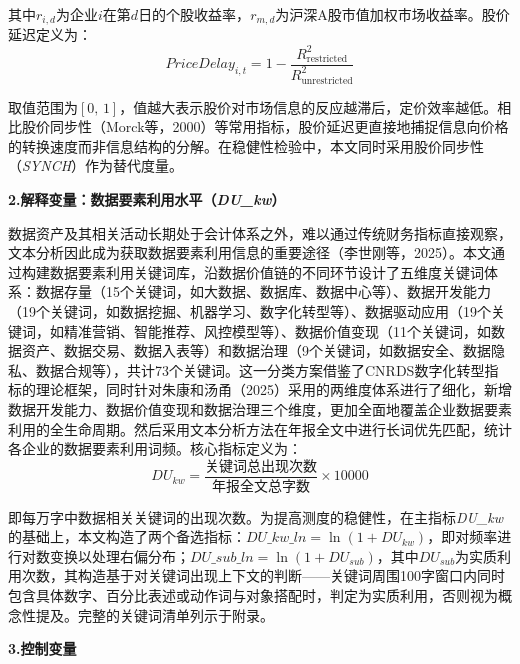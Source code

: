 \documentclass[11pt,a4paper]{article}
\begin{document}
其中$r_{i,d}$为企业$i$在第$d$日的个股收益率，$r_{m,d}$为沪深A股市值加权市场收益率。股价延迟定义为：
\vspace{-6pt}
\[ PriceDelay_{i,t} = 1 - \frac{R^2_{\text{restricted}}}{R^2_{\text{unrestricted}}} \]
\vspace{-6pt}

取值范围为$[0,\,1]$，值越大表示股价对市场信息的反应越滞后，定价效率越低。相比股价同步性（Morck等，2000）等常用指标，股价延迟更直接地捕捉信息向价格的转换速度而非信息结构的分解。在稳健性检验中，本文同时采用股价同步性（\textit{SYNCH}）作为替代度量。

\vspace{6pt}
\noindent\textbf{2.\hspace{0.5em}解释变量：数据要素利用水平（\textit{DU\_kw}）}

\vspace{2pt}

数据资产及其相关活动长期处于会计体系之外，难以通过传统财务指标直接观察，文本分析因此成为获取数据要素利用信息的重要途径（李世刚等，2025）。本文通过构建数据要素利用关键词库，沿数据价值链的不同环节设计了五维度关键词体系：数据存量（15个关键词，如大数据、数据库、数据中心等）、数据开发能力（19个关键词，如数据挖掘、机器学习、数字化转型等）、数据驱动应用（19个关键词，如精准营销、智能推荐、风控模型等）、数据价值变现（11个关键词，如数据资产、数据交易、数据入表等）和数据治理（9个关键词，如数据安全、数据隐私、数据合规等），共计73个关键词。这一分类方案借鉴了CNRDS数字化转型指标的理论框架，同时针对朱康和汤甬（2025）采用的两维度体系进行了细化，新增数据开发能力、数据价值变现和数据治理三个维度，更加全面地覆盖企业数据要素利用的全生命周期。然后采用文本分析方法在年报全文中进行长词优先匹配，统计各企业的数据要素利用词频。核心指标定义为：
\vspace{-6pt}
\[ DU_{kw} = \frac{\text{关键词总出现次数}}{\text{年报全文总字数}} \times 10000 \]
\vspace{-6pt}

即每万字中数据相关关键词的出现次数。为提高测度的稳健性，在主指标\textit{DU\_kw}的基础上，本文构造了两个备选指标：$DU\_kw\_ln = \ln(1 + DU_{kw})$，即对频率进行对数变换以处理右偏分布；$DU\_sub\_ln = \ln(1 + DU_{sub})$，其中$DU_{sub}$为实质利用次数，其构造基于对关键词出现上下文的判断------关键词周围100字窗口内同时包含具体数字、百分比表述或动作词与对象搭配时，判定为实质利用，否则视为概念性提及。完整的关键词清单列示于附录。

\vspace{6pt}
\noindent\textbf{3.\hspace{0.5em}控制变量}
\end{document}
